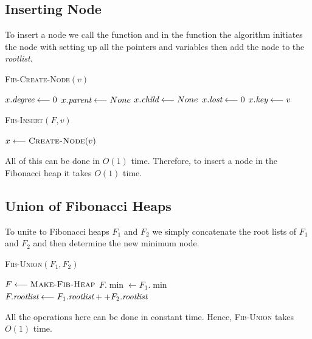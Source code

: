 \subsection{Inserting Node}
To insert a node we call the  function and in the function the algorithm initiates the node with setting up all the pointers and variables then add the node to the \emph{rootlist}.\parinf

\begin{minipage}{0.45\textwidth}
	\begin{algorithm}[H]
		\DontPrintSemicolon
		\caption{\textsc{Fib-Create-Node}$(v)$}
		$x.\emph{degree}\longleftarrow 0$\;
		$x.\emph{parent}\longleftarrow None$\;
		$x.\emph{child}\longleftarrow None$\;
		$x.\emph{lost}\longleftarrow 0$\;
		$x.\emph{key}\longleftarrow v$\;
	\end{algorithm}
\end{minipage}\hfill
\begin{minipage}{0.45\textwidth}
	\begin{algorithm}[H]
		\DontPrintSemicolon
		\caption{\textsc{Fib-Insert}$(F,v)$}
		$x\longleftarrow \textsc{Create-Node}(v)$\;
	\end{algorithm}
\end{minipage}

All of this can be done in $O(1)$ time. Therefore, to insert a node in the Fibonacci heap it takes $O(1)$ time.
\subsection{Union of Fibonacci Heaps}
To unite to Fibonacci heaps $F_1$ and $F_2$ we simply concatenate the root lists of $F_1$ and $F_2$ and then determine the new minimum node.
\begin{algorithm}
	\DontPrintSemicolon
	\caption{\textsc{Fib-Union}$(F_1,F_2)$}
	$F\longleftarrow \textsc{Make-Fib-Heap}$\;
	$F.\min\longleftarrow F_1.\min$\;
	$F.\emph{rootlist}\longleftarrow F_1.\emph{rootlist} ++ F_2.\emph{rootlist}$\;
\end{algorithm}
All the operations here can be done in constant time. Hence, \textsc{Fib-Union} takes $O(1)$ time.
